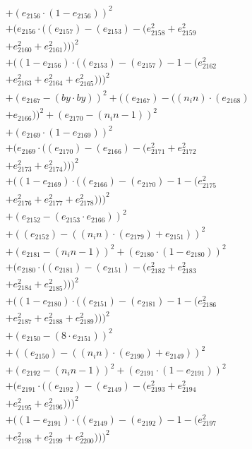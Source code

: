 \documentclass[10pt, a4paper]{article}
\begin{document}
\begin{small}
\begin{align*}
& + (e_{2156}  \cdot  (1 - e_{2156}))^{2} \\
& + (e_{2156}  \cdot  ((e_{2157}) - (e_{2153}) - (e_{2158}^{2} + e_{2159}^{2} \\
& + e_{2160}^{2} + e_{2161}^{2})))^{2} \\
& + ((1 - e_{2156})  \cdot  ((e_{2153}) - (e_{2157}) - 1 - (e_{2162}^{2} \\
& + e_{2163}^{2} + e_{2164}^{2} + e_{2165}^{2})))^{2} \\
& + (e_{2167} - (by  \cdot  by))^{2} + ((e_{2167}) - ((n_in)  \cdot  (e_{2168}) \\
& + e_{2166}))^{2} + (e_{2170} - (n_in - 1))^{2} \\
& + (e_{2169}  \cdot  (1 - e_{2169}))^{2} \\
& + (e_{2169}  \cdot  ((e_{2170}) - (e_{2166}) - (e_{2171}^{2} + e_{2172}^{2} \\
& + e_{2173}^{2} + e_{2174}^{2})))^{2} \\
& + ((1 - e_{2169})  \cdot  ((e_{2166}) - (e_{2170}) - 1 - (e_{2175}^{2} \\
& + e_{2176}^{2} + e_{2177}^{2} + e_{2178}^{2})))^{2} \\
& + (e_{2152} - (e_{2153}  \cdot  e_{2166}))^{2} \\
& + ((e_{2152}) - ((n_in)  \cdot  (e_{2179}) + e_{2151}))^{2} \\
& + (e_{2181} - (n_in - 1))^{2} + (e_{2180}  \cdot  (1 - e_{2180}))^{2} \\
& + (e_{2180}  \cdot  ((e_{2181}) - (e_{2151}) - (e_{2182}^{2} + e_{2183}^{2} \\
& + e_{2184}^{2} + e_{2185}^{2})))^{2} \\
& + ((1 - e_{2180})  \cdot  ((e_{2151}) - (e_{2181}) - 1 - (e_{2186}^{2} \\
& + e_{2187}^{2} + e_{2188}^{2} + e_{2189}^{2})))^{2} \\
& + (e_{2150} - (8  \cdot  e_{2151}))^{2} \\
& + ((e_{2150}) - ((n_in)  \cdot  (e_{2190}) + e_{2149}))^{2} \\
& + (e_{2192} - (n_in - 1))^{2} + (e_{2191}  \cdot  (1 - e_{2191}))^{2} \\
& + (e_{2191}  \cdot  ((e_{2192}) - (e_{2149}) - (e_{2193}^{2} + e_{2194}^{2} \\
& + e_{2195}^{2} + e_{2196}^{2})))^{2} \\
& + ((1 - e_{2191})  \cdot  ((e_{2149}) - (e_{2192}) - 1 - (e_{2197}^{2} \\
& + e_{2198}^{2} + e_{2199}^{2} + e_{2200}^{2})))^{2} \\

\end{align*}
\end{small}
\end{document}
